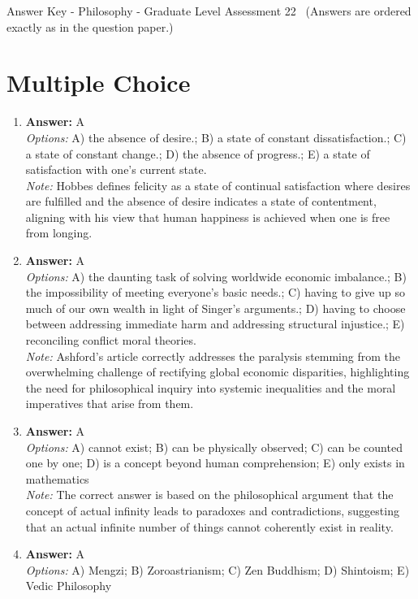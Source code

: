 \documentclass[12pt]{article}
\begin{document}
\begin{center}
Answer Key - Philosophy - Graduate Level Assessment 22 \
\small (Answers are ordered exactly as in the question paper.)
\end{center}

\section*{Multiple Choice}
\begin{enumerate}[label=\arabic*.]
\item \textbf{Answer:} A
\\ \textit{Options:} A) the absence of desire.; B) a state of constant dissatisfaction.; C) a state of constant change.; D) the absence of progress.; E) a state of satisfaction with one's current state.
\\ \textit{Note:} Hobbes defines felicity as a state of continual satisfaction where desires are fulfilled and the absence of desire indicates a state of contentment, aligning with his view that human happiness is achieved when one is free from longing.
\item \textbf{Answer:} A
\\ \textit{Options:} A) the daunting task of solving worldwide economic imbalance.; B) the impossibility of meeting everyone's basic needs.; C) having to give up so much of our own wealth in light of Singer's arguments.; D) having to choose between addressing immediate harm and addressing structural injustice.; E) reconciling conflict moral theories.
\\ \textit{Note:} Ashford's article correctly addresses the paralysis stemming from the overwhelming challenge of rectifying global economic disparities, highlighting the need for philosophical inquiry into systemic inequalities and the moral imperatives that arise from them.
\item \textbf{Answer:} A
\\ \textit{Options:} A) cannot exist; B) can be physically observed; C) can be counted one by one; D) is a concept beyond human comprehension; E) only exists in mathematics
\\ \textit{Note:} The correct answer is based on the philosophical argument that the concept of actual infinity leads to paradoxes and contradictions, suggesting that an actual infinite number of things cannot coherently exist in reality.
\item \textbf{Answer:} A
\\ \textit{Options:} A) Mengzi; B) Zoroastrianism; C) Zen Buddhism; D) Shintoism; E) Vedic Philosophy

\end{enumerate}
\end{document}
